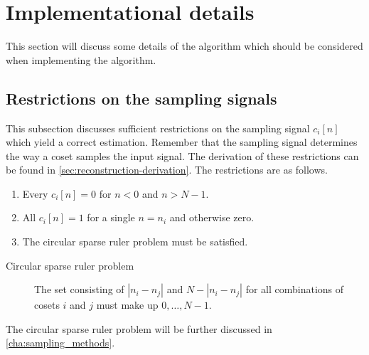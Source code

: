 \documentclass[a4paper, openany, oneside]{memoir}
\begin{document}
\section{Implementational details}
\label{sec:reconstruction-implementation}
This section will discuss some details of the algorithm which should be considered when implementing the algorithm.

\subsection{Restrictions on the sampling signals}
\label{sub:reconstruction-ci}
This subsection discusses sufficient restrictions on the sampling signal $c_i[n]$ which yield a correct estimation. Remember that the sampling signal determines the way a coset samples the input signal. The derivation of these restrictions can be found in \cref{sec:reconstruction-derivation}. The restrictions are as follows.

\begin{enumerate}
    \item Every $c_i[n]=0$ for $n < 0$ and $n > N-1$.
    \item All $c_i[n]=1$ for a single $n=n_i$ and otherwise zero.
    \item The circular sparse ruler problem must be satisfied.
\end{enumerate}

\begin{description}
    \item[Circular sparse ruler problem] The set consisting of $|n_i - n_j|$ and $N-|n_i-n_j|$ for all combinations of cosets $i$ and $j$ must make up $0,\ldots,N-1$.
\end{description}

The circular sparse ruler problem will be further discussed in \cref{cha:sampling_methods}.
\end{document}
